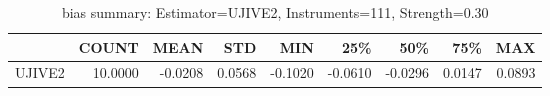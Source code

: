 \begin{table}[ht]
\centering
\caption{bias summary: Estimator=UJIVE2, Instruments=111, Strength=0.30}
\begin{tabular}{lrrrrrrrr}
\toprule
 & COUNT & MEAN & STD & MIN & 25\% & 50\% & 75\% & MAX \\
\midrule
UJIVE2 & 10.0000 & -0.0208 & 0.0568 & -0.1020 & -0.0610 & -0.0296 & 0.0147 & 0.0893 \\
\bottomrule
\end{tabular}
\end{table}
